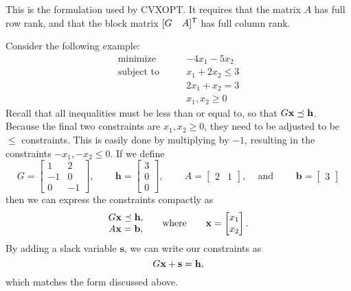 This is the formulation used by CVXOPT.
It requires that the matrix $A$ has full row rank,
and that the block matrix $[G \quad A]^{\mathsf T} $ has full column rank.


\begin{comment}
The corresponding \emph{dual program} for the above linear program has the form
\begin{align*}
\text{maximize}\qquad &-h\trp z - b\trp y \\
\text{subject to}\qquad &G\trp z + A\trp y + c = 0\\
 &z \geq 0.
\end{align*}
CVXOPT provides functions to solve both the original (\emph{primal}) linear program and its dual program.
\end{comment}

Consider the following example:
\begin{align*}
\text{minimize}\qquad &-4x_1-5x_2 \\
\text{subject to}\qquad &x_1+2x_2 \leq 3 \\
	        &2x_1+x_2 = 3 \\
		&x_1, x_2 \geq 0
\end{align*}
Recall that all inequalities must be less than or equal to, so that $G\mathbf{x}\preceq \mathbf{h}$.
Because the final two constraints are $x_1, x_2 \geq 0$, they need to be adjusted to be $\leq$ constraints.
This is easily done by multiplying by $-1$, resulting in the constraints $-x_1, -x_2 \leq 0$.
If we define
\[
G = \begin{bmatrix}
  1 & 2\\
  -1 & 0\\
  0 & -1
\end{bmatrix} \text{, } \qquad
\mathbf{h} = \begin{bmatrix}
  3\\
  0\\
  0
\end{bmatrix} \text{, } \qquad
A = \begin{bmatrix}
2 & 1
\end{bmatrix} \text{, } \quad \text{and } \qquad
\mathbf{b} = \begin{bmatrix}
3
\end{bmatrix}
\]
then we can express the constraints compactly as
\[
\begin{matrix}
G\mathbf{x} \preceq \mathbf{h},\\
A\mathbf{x} = \mathbf{b},
\end{matrix}  \qquad \text{where} \qquad
\mathbf{x} = \begin{bmatrix}
  x_1\\
  x_2
\end{bmatrix}.
\]
By adding a slack variable $\mathbf{s}$, we can write our constraints as
\[
G\mathbf{x} + \mathbf{s} = \mathbf{h},
\]
which matches the form discussed above.

